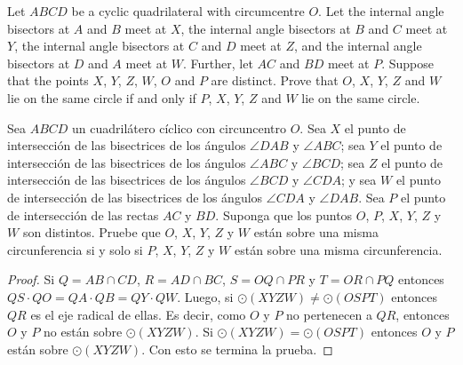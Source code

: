 \begin{probEG}[EGMO 2022/6]
	Let $ABCD$ be a cyclic quadrilateral with circumcentre $O$. Let the internal angle bisectors at $A$ and $B$ meet at $X$, the internal angle bisectors at $B$ and $C$ meet at $Y$, the internal angle bisectors at $C$ and $D$ meet at $Z$, and the internal angle bisectors at $D$ and $A$ meet at $W$. Further, let $AC$ and $BD$ meet at $P$. Suppose that the points $X$, $Y$, $Z$, $W$, $O$ and $P$ are distinct. Prove that $O$, $X$, $Y$, $Z$ and $W$ lie on the same circle if and only if $P$, $X$, $Y$, $Z$ and $W$ lie on the same circle.
	\begin{probSP}
		Sea $ABCD$ un cuadrilátero cíclico con circuncentro $O$. Sea $X$ el punto de intersección de las bisectrices de los ángulos $\angle DAB$ y $\angle ABC$; sea $Y$ el punto de intersección de las bisectrices de los ángulos $\angle ABC$ y $\angle BCD$; sea $Z$ el punto de intersección de las bisectrices de los ángulos $\angle BCD$ y $\angle CDA$; y sea $W$ el punto de intersección de las bisectrices de los ángulos $\angle CDA$ y $\angle DAB$. Sea $P$ el punto de intersección de las rectas $AC$ y $BD$. Suponga que los puntos $O$, $P$, $X$, $Y$, $Z$ y $W$ son distintos. Pruebe que $O$, $X$, $Y$, $Z$ y $W$ están sobre una misma circunferencia si y solo si $P$, $X$, $Y$, $Z$ y $W$ están sobre una misma circunferencia.
	\end{probSP}
\end{probEG}

\begin{proof}
	Si $Q=AB\cap CD$, $R=AD\cap BC$, $S=OQ\cap PR$ y $T=OR\cap PQ$ entonces $QS\cdot QO=QA\cdot QB=QY\cdot QW$. Luego, si $\odot(XYZW)\neq\odot(OSPT)$ entonces $QR$ es el eje radical de ellas. Es decir, como $O$ y $P$ no pertenecen a $QR$, entonces $O$ y $P$ no están sobre $\odot(XYZW)$. Si $\odot(XYZW)=\odot(OSPT)$ entonces $O$ y $P$ están sobre $\odot(XYZW)$. Con esto se termina la prueba.
\end{proof}
